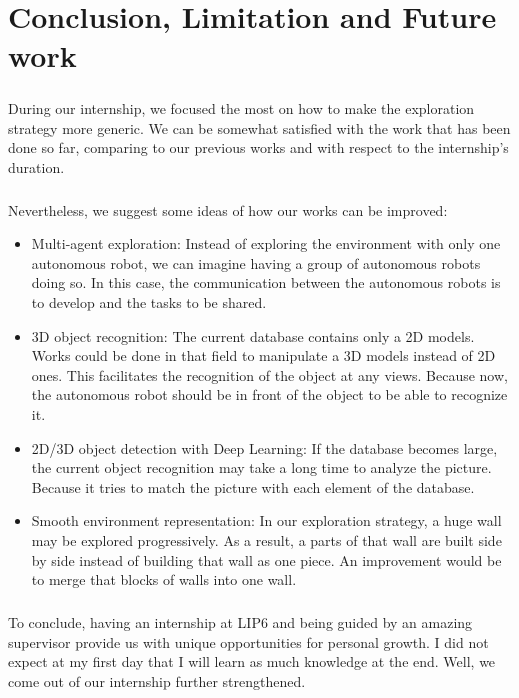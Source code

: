 \documentclass[12pt]{report}
\begin{document}
	\chapter{Conclusion, Limitation and Future work}
	\paragraph{}
	During our internship, we focused the most on how to make the exploration strategy more generic. We can be somewhat satisfied with the work that has been done so far, comparing to our previous works and with respect to the internship's duration.

	\paragraph{}
	Nevertheless, we suggest some ideas of how our works can be improved:
	\begin{itemize}
		\item Multi-agent exploration: Instead of exploring the environment with only one autonomous robot, we can imagine having a group of autonomous robots doing so. In this case, the communication between the autonomous robots is to develop and the tasks to be shared.
		\item 3D object recognition: The current database contains only a 2D models. Works could be done in that field to manipulate a 3D models instead of 2D ones. This facilitates the recognition of the object at any views. Because now, the autonomous robot should be in front of the object to be able to recognize it.
		\item 2D/3D object detection with Deep Learning: If the database becomes large, the current object recognition may take a long time to analyze the picture. Because it tries to match the picture with each element of the database.
		\item Smooth environment representation: In our exploration strategy, a huge wall may be explored progressively. As a result, a parts of that wall are built side by side instead of building that wall as one piece. An improvement would be to merge that blocks of walls into one wall.
		
	\end{itemize}
\paragraph{}
To conclude, having an internship at LIP6 and being guided by an amazing supervisor provide us with unique opportunities for personal growth. I did not expect at my first day that I will learn as much knowledge at the end. Well, we come out of our internship further strengthened. 

	\nocite{*}
    \printbibliography[heading=bibintoc,title={References}]
\end{document}
